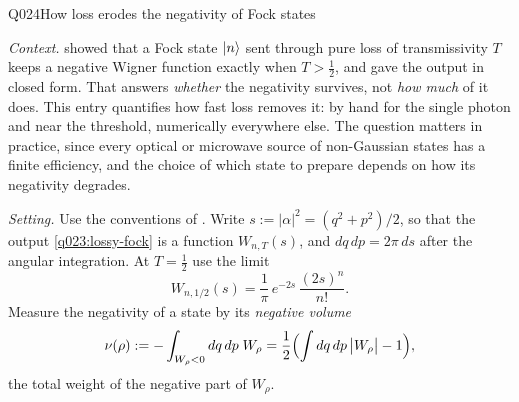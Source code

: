 \begin{entry}{Q024}{How loss erodes the negativity of Fock states}


\begin{problem}
\emph{Context.}  showed that a Fock state $\lvert n \rangle$ sent through pure loss of
transmissivity $T$ keeps a negative Wigner function exactly when $T>\tfrac12$, and gave the
output in closed form. That answers \emph{whether} the negativity survives, not \emph{how
much} of it does. This entry quantifies how fast loss removes it: by hand for the single
photon and near the threshold, numerically everywhere else. The question matters in
practice, since every optical or microwave source of non-Gaussian states has a finite
efficiency, and the choice of which state to prepare depends on how its negativity degrades.

\emph{Setting.} Use the conventions of . Write $s:=|\alpha|^{2}=(q^2+p^2)/2$, so
that the output \eqref{q023:lossy-fock} is a function $W_{n,T}(s)$, and
$dq\,dp=2\pi\,ds$ after the angular integration. At $T=\tfrac12$ use the limit
\begin{equation}
  W_{n,1/2}(s)=\frac{1}{\pi}\,e^{-2s}\,\frac{(2s)^{n}}{n!}.
  \label{q024:half}
\end{equation}
Measure the negativity of a state by its \emph{negative volume}
\begin{equation}
  \nu(\rho):=-\int_{W_\rho<0}dq\,dp\;W_\rho
  =\frac12\Bigl(\int dq\,dp\,\bigl|W_\rho\bigr|-1\Bigr),
  \label{q024:negvol}
\end{equation}
the total weight of the negative part of $W_\rho$. 


\end{problem}
\end{entry}
